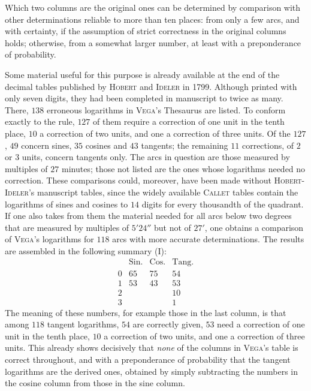 Which two columns are the original ones can be determined by comparison with other determinations reliable to more than ten places: from only a few arcs, and with certainty, if the assumption of strict correctness in the original columns holds; otherwise, from a somewhat larger number, at least with a preponderance of probability.

Some material useful for this purpose is already available at the end of the decimal tables published by \textsc{Hobert} and \textsc{Ideler} in 1799. Although printed with only seven digits, they had been completed in manuscript to twice as many. There, \(138\) erroneous logarithms in \textsc{Vega}'s Thesaurus are listed. To conform exactly to the rule, \(127\) of them require a correction of one unit in the tenth place, \(10\) a correction of two units, and one a correction of three units. Of the \(127\), \(49\) concern sines, \(35\) cosines and \(43\) tangents; the remaining \(11\) corrections, of \(2\) or \(3\) units, concern tangents only. The arcs in question are those measured by multiples of \(27\) minutes; those not listed are the ones whose logarithms needed no correction. These comparisons could, moreover, have been made without \textsc{Hobert-Ideler}'s manuscript tables, since the widely available \textsc{Callet} tables contain the logarithms of sines and cosines to \(14\) digits for every thousandth of the quadrant. If one also takes from them the material needed for all arcs below  two degrees that are measured by multiples of \(5'24''\) but not of \(27'\), one obtains a comparison of \textsc{Vega}'s logarithms for \(118\) arcs with more accurate determinations. The results are assembled in the following summary (I):
\[
\begin{array}{rccc}
 & \mathrm{Sin.} & \mathrm{Cos.} & \mathrm{Tang.} \\
0 & 65 & 75 & 54 \\
1 & 53 & 43 & 53 \\
2 &    &    & 10 \\
3 &    &    & 1
\end{array}
\]
The meaning of these numbers, for example those in the last column, is that among \(118\) tangent logarithms, \(54\) are correctly given, \(53\) need a correction of one unit in the tenth place, \(10\) a correction of two units, and one a correction of three units. This already shows decisively that \emph{none} of the columns in \textsc{Vega}'s table is correct throughout, and with a preponderance of probability that the tangent logarithms are the derived ones, obtained by simply subtracting the numbers in the cosine column from those in the sine column.

